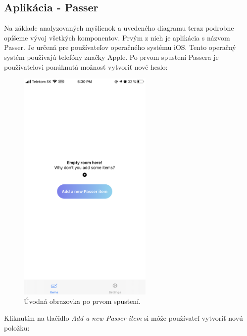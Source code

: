 \subsection{Aplikácia - Passer}
\label{passer}
Na základe analyzovaných myšlienok a uvedeného diagramu teraz podrobne opíšeme vývoj všetkých komponentov. Prvým z nich je aplikácia s názvom Passer. Je určená pre používateľov operačného systému iOS. Tento operačný systém používajú telefóny značky Apple. 
Po prvom spustení Passera je používateľovi ponúknutá možnosť vytvoriť nové heslo: 

\begin{figure}[H]
  \centering
  \includegraphics[width=6.5cm]{img/passer1.PNG}
  \caption{Úvodná obrazovka po prvom spustení.}
  \label{passer1}
\end{figure}

Kliknutím na tlačidlo \textit{Add a new Passer item} si môže používateľ vytvoriť novú položku: 

